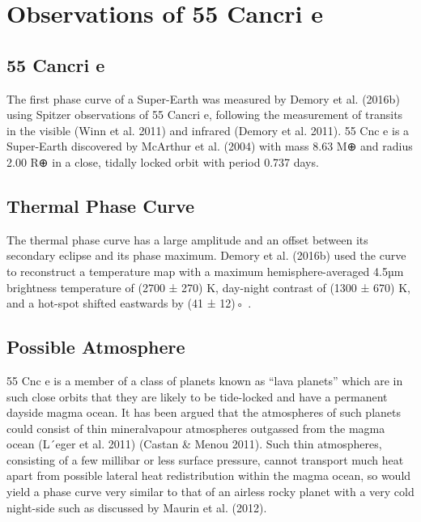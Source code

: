\section{Observations of 55 Cancri e}

\subsection*{55 Cancri e}


The first phase curve of a Super-Earth was measured by Demory et al. (2016b) using Spitzer observations of 55 Cancri e, following the measurement of
transits in the visible (Winn et al. 2011) and infrared
(Demory et al. 2011). 55 Cnc e is a Super-Earth discovered by McArthur et al. (2004) with mass 8.63 M⊕ and
radius 2.00 R⊕ in a close, tidally locked orbit with period
0.737 days.

\subsection*{Thermal Phase Curve}

The thermal phase curve has a large amplitude and an offset between its secondary eclipse and its
phase maximum. Demory et al. (2016b) used the curve
to reconstruct a temperature map with a maximum
hemisphere-averaged 4.5µm brightness temperature of
(2700 ± 270) K, day-night contrast of (1300 ± 670) K,
and a hot-spot shifted eastwards by (41 ± 12)◦
.

\subsection*{Possible Atmosphere}

55 Cnc e is a member of a class of planets known as
“lava planets” which are in such close orbits that they
are likely to be tide-locked and have a permanent dayside magma ocean. It has been argued that the atmospheres of such planets could consist of thin mineralvapour atmospheres outgassed from the magma ocean
(L´eger et al. 2011) (Castan & Menou 2011). Such thin
atmospheres, consisting of a few millibar or less surface
pressure, cannot transport much heat apart from possible lateral heat redistribution within the magma ocean,
so would yield a phase curve very similar to that of an
airless rocky planet with a very cold night-side such as
discussed by Maurin et al. (2012).

